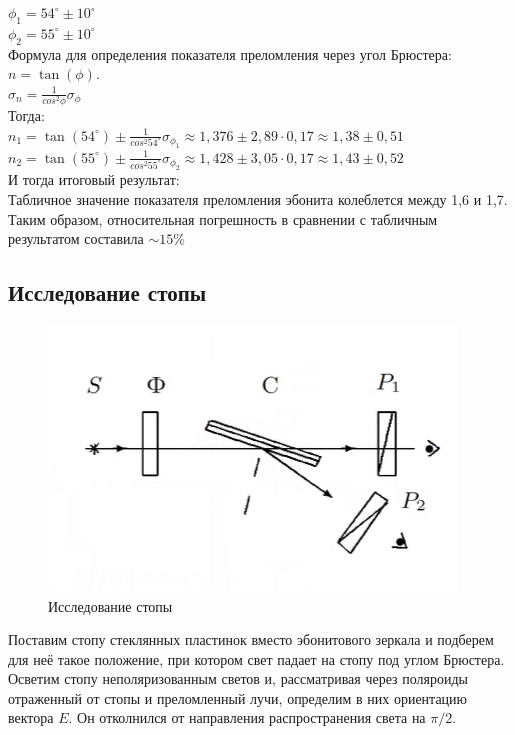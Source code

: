 \documentclass[a4paper]{article}
\begin{document}
$\phi_1 = 54^{\circ} \pm 10^{\circ}$\\
$\phi_2 = 55^{\circ} \pm 10^{\circ}$\\
Формула для определения показателя преломления через угол Брюстера: $n = \tan(\phi)$.\\
$\sigma_n = \frac{1}{cos^2{\phi}}\sigma_{\phi}$\\
Тогда: \\
$n_1 = \tan(54^{\circ}) \pm \frac{1}{cos^2{54^{\circ}}}\sigma_{\phi_1} \approx 1,376 \pm 2,89\cdot0,17 \approx 1,38 \pm 0,51$\\
$n_2 = \tan(55^{\circ}) \pm \frac{1}{cos^2{55^{\circ}}}\sigma_{\phi_2} \approx 1,428 \pm 3,05\cdot0,17 \approx 1,43 \pm 0,52$\\
И тогда итоговый результат: \\
Табличное значение показателя преломления эбонита колеблется между 1,6 и 1,7. Таким образом, относительная погрешность в сравнении с табличным результатом составила $\sim 15 \%$\\
\subsection{Исследование стопы}

\begin{figure}
\includegraphics[width=\linewidth]{6}
	\caption{Исследование стопы}
	\label{ris 6}
\end{figure}
Поставим  стопу стеклянных пластинок вместо эбонитового зеркала
и подберем для неё такое положение, при котором свет падает на стопу под углом Брюстера.\\
Осветим стопу неполяризованным светов и, рассматривая через поляроиды отраженный от стопы и преломленный лучи, определим в них ориентацию вектора $E$. Он отколнился от направления распространения света на $\pi/2$.\\
\\
\\
\\
\end{document}
